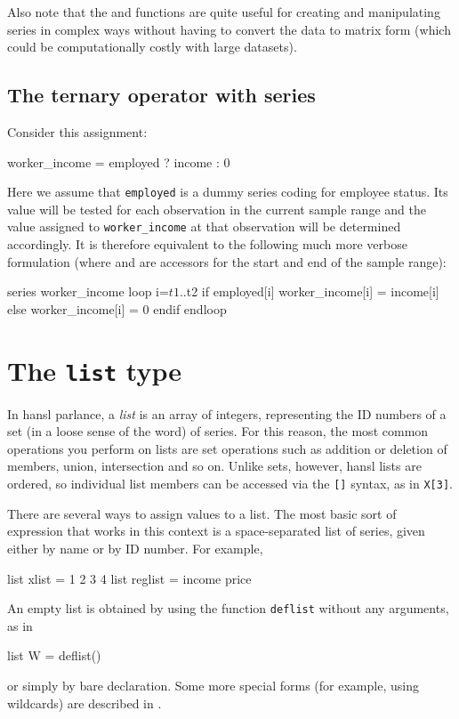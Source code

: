 Also note that the  and  functions are quite
useful for creating and manipulating series in complex ways without
having to convert the data to matrix form (which could be
computationally costly with large datasets).

\subsection{The ternary operator with series}

Consider this assignment:

\begin{code}
  worker_income = employed ? income : 0
\end{code}

Here we assume that \texttt{employed} is a dummy series coding for
employee status. Its value will be tested for each observation in the
current sample range and the value assigned to \texttt{worker\_income}
at that observation will be determined accordingly. It is therefore
equivalent to the following much more verbose formulation (where
 and  are accessors for the start and end of the
sample range):
\begin{code}
series worker_income
loop i=$t1..$t2
    if employed[i]
        worker_income[i] = income[i]
    else
        worker_income[i] = 0
    endif
endloop
\end{code}

\section{The \texttt{list} type}
\label{sec:lists}
 
In hansl parlance, a \textit{list} is an array of integers,
representing the ID numbers of a set (in a loose sense of the word) of
series.  For this reason, the most common operations you perform on
lists are set operations such as addition or deletion of members,
union, intersection and so on. Unlike sets, however, hansl lists are
ordered, so individual list members can be accessed via the
\texttt{[]} syntax, as in \texttt{X[3]}.

There are several ways to assign values to a list.  The most basic
sort of expression that works in this context is a space-separated
list of series, given either by name or by ID number.  For example,
\begin{code}
list xlist = 1 2 3 4
list reglist = income price 
\end{code}
An empty list is obtained by using the function \texttt{deflist}
without any arguments, as in
\begin{code}
list W = deflist()  
\end{code}
or simply by bare declaration. Some more special forms (for example,
using wildcards) are described in \GUG.


